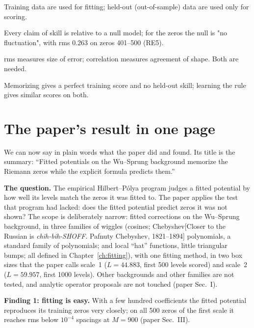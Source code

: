 \begin{keyideas}
\item Training data are used for fitting; held-out (out-of-sample) data are used only for scoring.
\item Every claim of skill is relative to a null model; for the zeros the null is "no fluctuation", with rms $0.263$ on zeros 401--500 (RE5).
\item rms measures size of error; correlation measures agreement of shape. Both are needed.
\item Memorizing gives a perfect training score and no held-out skill; learning the rule gives similar scores on both.
\end{keyideas}

\section{The paper's result in one page}\label{sec:intro-result}

We can now say in plain words what the paper \cite{soniR1} did and found. Its title is the summary: ``Fitted potentials on the Wu--Sprung background memorize the Riemann zeros while the explicit formula predicts them.''

\textbf{The question.} The empirical Hilbert--P\'olya program judges a fitted potential by how well its levels match the zeros it was fitted to. The paper applies the test that program had lacked: does the fitted potential predict zeros it was not shown? The scope is deliberately narrow: fitted corrections on the Wu--Sprung background, in three families of wiggles (cosines; Chebyshev[Closer to the Russian is \emph{chih-bih-SHOFF}. Pafnuty Chebyshev, 1821--1894] polynomials, a standard family of polynomials; and local ``hat'' functions, little triangular bumps; all defined in Chapter~\ref{ch:fitting}), with one fitting method, in two box sizes that the paper calls scale~1 ($L = 44.883$, first 500 levels scored) and scale~2 ($L = 59.957$, first 1000 levels). Other backgrounds and other families are not tested, and analytic operator proposals are not touched (paper Sec.~I).

\textbf{Finding 1: fitting is easy.} With a few hundred coefficients the fitted potential reproduces its training zeros very closely; on all 500 zeros of the first scale it reaches rms below $10^{-4}$ spacings at $M = 900$ (paper Sec.~III).

